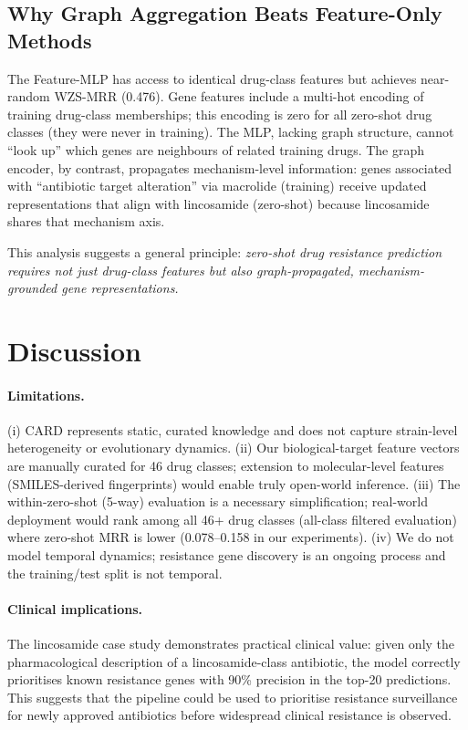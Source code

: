 \documentclass[conference]{IEEEtran}
\begin{document}
\subsection{Why Graph Aggregation Beats Feature-Only Methods}
The Feature-MLP has access to identical drug-class features but
achieves near-random WZS-MRR (0.476). Gene features include a multi-hot
encoding of training drug-class memberships; this encoding is zero for
all zero-shot drug classes (they were never in training). The MLP,
lacking graph structure, cannot ``look up'' which genes are neighbours
of related training drugs. The graph encoder, by contrast, propagates
mechanism-level information: genes associated with
``antibiotic target alteration'' via macrolide (training) receive
updated representations that align with lincosamide (zero-shot) because
lincosamide shares that mechanism axis.

This analysis suggests a general principle: \emph{zero-shot drug
resistance prediction requires not just drug-class features but also
graph-propagated, mechanism-grounded gene representations.}


\section{Discussion}

\paragraph{Limitations.}
(i) CARD represents static, curated knowledge and does not capture
strain-level heterogeneity or evolutionary dynamics.
(ii) Our biological-target feature vectors are manually curated for
46 drug classes; extension to molecular-level features (SMILES-derived
fingerprints) would enable truly open-world inference.
(iii) The within-zero-shot (5-way) evaluation is a necessary simplification;
real-world deployment would rank among all 46+ drug classes (all-class
filtered evaluation) where zero-shot MRR is lower (0.078–0.158 in our
experiments).
(iv) We do not model temporal dynamics; resistance gene discovery is
an ongoing process and the training/test split is not temporal.

\paragraph{Clinical implications.}
The lincosamide case study demonstrates practical clinical value: given
only the pharmacological description of a lincosamide-class antibiotic,
the model correctly prioritises known resistance genes with 90\%
precision in the top-20 predictions. This suggests that the pipeline
could be used to prioritise resistance surveillance for newly approved
antibiotics before widespread clinical resistance is observed.
\end{document}
